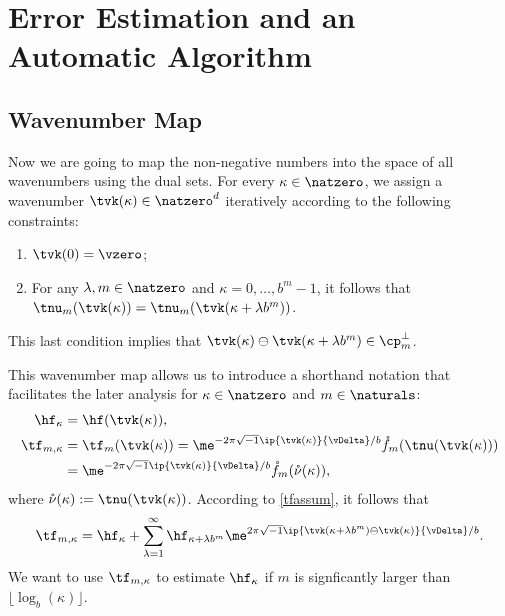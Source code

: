 \documentclass[]{elsarticle}
\theoremstyle{definition}
\renewcommand{\bbK}{\natzero^d}
\newcommand{\rf}{\mathring{f}}
\newcommand{\rnu}{\mathring{\nu}}
\begin{document}
\section{Error Estimation and an Automatic Algorithm}

\subsection{Wavenumber Map}

Now we are going to map the non-negative numbers into the space of all wavenumbers using the dual sets.  For every $\kappa \in \natzero$, we assign a wavenumber $\tvk(\kappa) \in \bbK$ iteratively according to the following constraints: 
\begin{enumerate}
\renewcommand{\labelenumi}{\roman{enumi})}

\item $\tvk(0)= \vzero$;

\item For any $\lambda, m \in \natzero$ and $\kappa=0, \ldots, b^m-1$, it follows that  $\tnu_m(\tvk(\kappa))=\tnu_m(\tvk(\kappa+\lambda b^m))$.

\end{enumerate}
This last condition implies that $\tvk(\kappa) \ominus \tvk(\kappa+\lambda b^m) \in \cp_m^{\perp}$.

This wavenumber map allows us to introduce a shorthand notation that facilitates the later analysis for $\kappa \in \natzero$ and $m \in \naturals$:
\begin{align*}
\hf_{\kappa} & =\hf(\tvk(\kappa)), \\
\tf_{m,\kappa}& = \tf_m(\tvk(\kappa))= \me^{-2 \pi \sqrt{-1} \ip{\tvk(\kappa)}{\vDelta}/b} \rf_m(\tnu(\tvk(\kappa)))\\
&= \me^{-2 \pi \sqrt{-1} \ip{\tvk(\kappa)}{\vDelta}/b} \rf_m(\rnu(\kappa)),
\end{align*}
where $\rnu(\kappa):=\tnu(\tvk(\kappa))$. According to \eqref{tfassum}, it follows that 
\begin{equation}
\tf_{m,\kappa} = \hf_{\kappa} + \sum_{\lambda=1}^{\infty} \hf_{\kappa+\lambda b^{m}} \me^{2 \pi \sqrt{-1} \ip{\tvk(\kappa+\lambda b^{m}) \ominus \tvk(\kappa)}{\vDelta}/b}.
\label{tfassumc}
\end{equation}
We want to use $\tf_{m,\kappa}$ to estimate $\hf_{\kappa}$ if $m$ is signficantly larger than $\lfloor \log_b(\kappa) \rfloor$.
\end{document}
